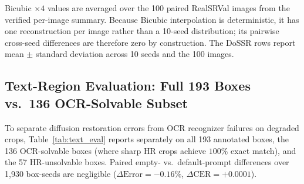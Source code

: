 \documentclass[11pt]{article}
\begin{document}
\begin{table}[ht]
\centering
\small
\caption{Whole-image evaluation on RealSRVal (100 images, seeds 42--51, 5 steps, \texttt{FP16}, \texttt{SDPA OFF}).}
\label{tab:whole_image}
\end{table}
\noindent\footnotesize Bicubic $\times 4$ values are averaged over the 100 paired RealSRVal images from the verified per-image summary. Because Bicubic interpolation is deterministic, it has one reconstruction per image rather than a 10-seed distribution; its pairwise cross-seed differences are therefore zero by construction. The DoSSR rows report mean $\pm$ standard deviation across 10 seeds and the 100 images.\normalsize

\subsection{Text-Region Evaluation: Full 193 Boxes vs.\ 136 OCR-Solvable Subset}
To separate diffusion restoration errors from OCR recognizer failures on degraded crops, Table~\ref{tab:text_eval} reports separately on all 193 annotated boxes, the 136 OCR-solvable boxes (where sharp HR crops achieve $100\%$ exact match), and the 57 HR-unsolvable boxes. Paired empty- vs.\ default-prompt differences over 1,930 box-seeds are negligible ($\Delta\text{Error} = -0.16\%$, $\Delta\text{CER} = +0.0001$).
\end{document}
